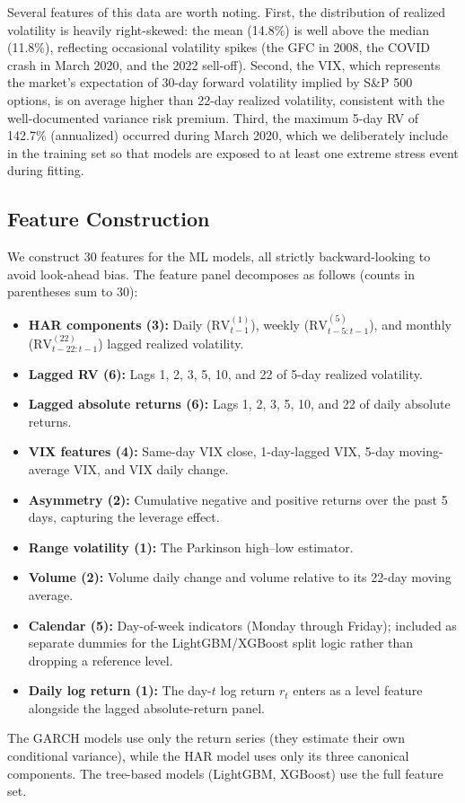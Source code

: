 Several features of this data are worth noting. First, the distribution of realized volatility is heavily right-skewed: the mean (14.8\%) is well above the median (11.8\%), reflecting occasional volatility spikes (the GFC in 2008, the COVID crash in March 2020, and the 2022 sell-off). Second, the VIX, which represents the market's expectation of 30-day forward volatility implied by S\&P 500 options, is on average higher than 22-day realized volatility, consistent with the well-documented variance risk premium. Third, the maximum 5-day RV of 142.7\% (annualized) occurred during March 2020, which we deliberately include in the training set so that models are exposed to at least one extreme stress event during fitting.

\subsection{Feature Construction}

We construct 30 features for the ML models, all strictly backward-looking to avoid look-ahead bias. The feature panel decomposes as follows (counts in parentheses sum to 30):

\begin{itemize}[leftmargin=*]
    \item \textbf{HAR components (3):} Daily ($\text{RV}_{t-1}^{(1)}$), weekly ($\text{RV}_{t-5:t-1}^{(5)}$), and monthly ($\text{RV}_{t-22:t-1}^{(22)}$) lagged realized volatility.
    \item \textbf{Lagged RV (6):} Lags 1, 2, 3, 5, 10, and 22 of 5-day realized volatility.
    \item \textbf{Lagged absolute returns (6):} Lags 1, 2, 3, 5, 10, and 22 of daily absolute returns.
    \item \textbf{VIX features (4):} Same-day VIX close, 1-day-lagged VIX, 5-day moving-average VIX, and VIX daily change.
    \item \textbf{Asymmetry (2):} Cumulative negative and positive returns over the past 5 days, capturing the leverage effect.
    \item \textbf{Range volatility (1):} The Parkinson high--low estimator.
    \item \textbf{Volume (2):} Volume daily change and volume relative to its 22-day moving average.
    \item \textbf{Calendar (5):} Day-of-week indicators (Monday through Friday); included as separate dummies for the LightGBM/XGBoost split logic rather than dropping a reference level.
    \item \textbf{Daily log return (1):} The day-$t$ log return $r_t$ enters as a level feature alongside the lagged absolute-return panel.
\end{itemize}

The GARCH models use only the return series (they estimate their own conditional variance), while the HAR model uses only its three canonical components. The tree-based models (LightGBM, XGBoost) use the full feature set.
